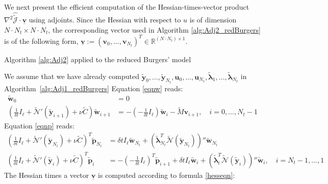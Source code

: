 We next present the efficient computation of the Hessian-times-vector product $\nabla^2 \hat{\tilde{\mathcal J}} \cdot \mathbf{\underline{v}}$ using adjoints. Since the Hessian with respect to $u$ is of dimension $N \cdot N_t \times N \cdot N_t$, the corresponding vector used in Algorithm \ref{alg:Adj2_redBurgers} is of the following form, $\mathbf{\underline{v}} := (\mathbf{v}_0, ..., \mathbf{v}_{N_t})^T \in \mathbb{R}^{(N \cdot N_t) \times 1}$.
\begin{algorithm}[H]
\caption{Algorithm \ref{alg:Adj2} applied to the reduced Burgers' model}
\label{alg:Adj2_redBurgers}
\begin{algorithmic}[1]
\STATE We assume that we have already computed $\mathbf{\tilde{y}}_0,...,\mathbf{\tilde{y}}_{N_t}, \mathbf{u}_0,...,\mathbf{u}_{N_t},\boldsymbol{\tilde{\lambda}}_1,...,\boldsymbol{\tilde{\lambda}}_{N_t}$ in \mbox{Algorithm \ref{alg:Adj1_redBurgers}}
\STATE Equation \eqref{eqnw} reads:
\begin{subequations}
\begin{align}
\label{wRedOrder_init}
\mathbf{\tilde{w}}_0 &= 0 \\
\label{wRedOrder}
\left( \frac{1}{\delta \!t} I_\ell + \tilde{\mathcal{N}}'(\mathbf{\tilde{y}}_{i+1})  + \nu \tilde{C}\right) \mathbf{\tilde{w}}_{i+1} &=  - (-\frac{1}{\delta \! t}I_\ell)\mathbf{\tilde{w}}_i - \tilde{M}\mathbf{v}_{i+1} , \quad i = 0,...,N_t-1
\end{align}
\end{subequations}
\STATE Equation \eqref{eqnp} reads:
\begin{subequations}
\begin{align}
\label{pRedOrder_term}
\left( \frac{1}{\delta \!t} I_\ell + \tilde{\mathcal{N}}'(\mathbf{\tilde{y}}_{N_t})  + \nu \tilde{C} \right)^T \mathbf{\tilde{p}}_{N_t} &= \delta \! t I_\ell \mathbf{\tilde{w}}_{N_t} + \left( \tilde{\boldsymbol \lambda}_{N_t}^T \tilde{\mathcal{N}}(\mathbf{\tilde{y}}_{N_t}) \right)'' \mathbf{\tilde{w}}_{N_t} \\
\label{pRedOrder}
\left( \frac{1}{\delta \!t} I_\ell + \tilde{\mathcal{N}}'(\mathbf{\tilde{y}}_{i})  + \nu \tilde{C} \right)^T \mathbf{\tilde{p}}_{i} &=  -(-\frac{1}{\delta \! t}I_\ell)^T\mathbf{\tilde{p}}_{i+1} + \delta \! t I_\ell \mathbf{\tilde{w}}_i + \left( \tilde{\boldsymbol \lambda}_{i}^T \tilde{\mathcal{N}}(\mathbf{\tilde{y}}_{i}) \right)'' \mathbf{\tilde{w}}_{i}, \quad i = N_t-1,...,1
\end{align}
\end{subequations}
\STATE The Hessian times a vector $\mathbf{\underline{v}}$ is computed according to formula \eqref{hesseqn}:

\end{algorithmic}
\end{algorithm}

